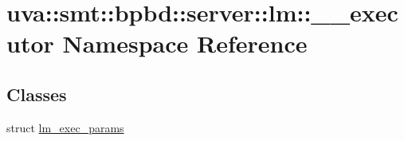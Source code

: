 \hypertarget{namespaceuva_1_1smt_1_1bpbd_1_1server_1_1lm_1_1____executor}{}\section{uva\+:\+:smt\+:\+:bpbd\+:\+:server\+:\+:lm\+:\+:\+\_\+\+\_\+executor Namespace Reference}
\label{namespaceuva_1_1smt_1_1bpbd_1_1server_1_1lm_1_1____executor}
\subsection*{Classes}
\begin{DoxyCompactItemize}
\item 
struct \hyperlink{structuva_1_1smt_1_1bpbd_1_1server_1_1lm_1_1____executor_1_1lm__exec__params}{lm\+\_\+exec\+\_\+params}
\end{DoxyCompactItemize}

